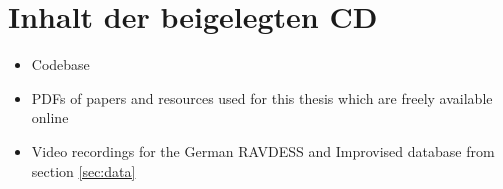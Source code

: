 \documentclass[11pt,a4paper,twoside]{article}
\begin{document}

\cleardoublepage
\fancyhead[LE,RO,LO,RE]{} %
\section*{Inhalt der beigelegten CD}

\begin{itemize}
    \item Codebase
    \item PDFs of papers and resources used for this thesis which are freely available online
    \item Video recordings for the German RAVDESS and Improvised database from section \ref{sec:data}
\end{itemize}

\cleardoublepage
\printbibliography
\end{document}
